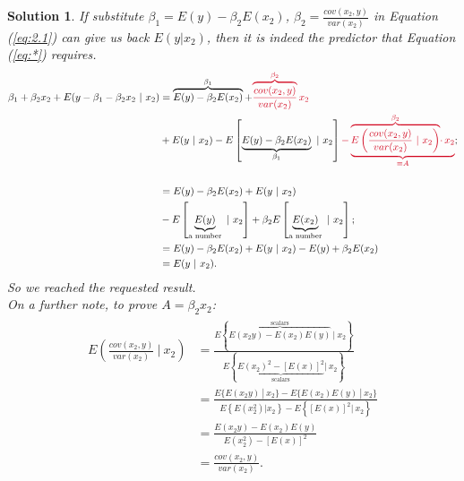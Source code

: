 \documentclass[9pt]{tufte-handout}
\newcommand{\inline}[1]{$ #1 $}
\newcommand{\qedblack}{\hfill \blacksquare}
\newtheorem*{Solution}{Solution}
\begin{document}
{\begin{Solution}
 If substitute $\displaystyle \beta _{1} =E( y) -\beta _{2} E( x_{2})$, $\displaystyle \beta _{2} =\frac{cov( x_{2} ,y)}{var( x_{2})}$ in Equation (\ref{eq:2.1}) can give us back \inline{E(y \vert x_2)}, then it is indeed the predictor that Equation (\ref{eq:*}) requires.
\begin{equation*}
\begin{aligned}
\beta _{1} +\beta _{2} x_{2} +E( y-\beta _{1} -\beta _{2} x_{2} \ |\ x_{2}) & =\overbrace{E( y) -\beta _{2} E( x_{2})}^{\beta _{1}} +\textcolor[rgb]{0.82,0.01,0.11}{\overbrace{\frac{cov( x_{2} ,y)}{var( x_{2})}}^{\beta _{2}} x_{2}}\\
 & +E( y\ |\ x_{2}) -E\left[\underbrace{E( y) -\beta _{2} E( x_{2})}_{\beta _{1}} \ |\ x_{2}\right]\textcolor[rgb]{0.82,0.01,0.11}{-\underbrace{\textcolor[rgb]{0.82,0.01,0.11}{\overbrace{\textcolor[rgb]{0.82,0.01,0.11}{E\left(\frac{cov( x_{2} ,y)}{var( x_{2})} \ |\ x_{2}\right)}}^{\beta _{2}} \cdotp x_{2}}}_{\equiv A}} ;\\
 & \\
 & =E( y) -\beta _{2} E( x_{2}) +E( y\ |\ x_{2})\\
 & -E\left[\underbrace{E( y)}_{\text{a number}} \ |\ x_{2}\right] +\beta _{2} E\left[\underbrace{E( x_{2})}_{\text{a number}} \ |\ x_{2}\right] ;\\
 & =E( y) -\beta _{2} E( x_{2}) +E( y\ |\ x_{2}) -E( y) +\beta _{2} E( x_{2})\\
 & =E( y\ |\ x_{2}) .
\end{aligned}
\end{equation*}
So we reached the requested result. \\
\noindent On a further note, to prove $\displaystyle A=\beta _{2} x_{2}$:
\begin{gather*}
\begin{aligned}
E\left(\frac{cov( x_{2} ,y)}{var( x_{2})} \ |\ x_{2}\right) & =\frac{E\left\{\overbrace{E( x_{2} y) -E( x_{2}) E( y)}^{\text{scalars}} \ |\ x_{2}\right\}}{E\left\{\underbrace{E( x_{2})^{2} -[ E( x)]^{2}}_{\text{scalars}} |\ x_{2}\right\}}\\
 & =\frac{E\{E( x_{2} y) \ |\ x_{2}\} -E\{E( x_{2}) E( y) \ |\ x_{2}\}}{E\left\{E\left( x_{2}^{2}\right) |x_{2}\right\} -E\left\{[ E( x)]^{2} |\ x_{2}\right\}}\\
 & =\frac{E( x_{2} y) -E( x_{2}) E( y)}{E\left( x_{2}^{2}\right) -[ E( x)]^{2}}\\
 & =\frac{cov( x_{2} ,y)}{var( x_{2})} .
\end{aligned}\\
\end{gather*}
\qedblack
\end{Solution}
}
\end{document}
